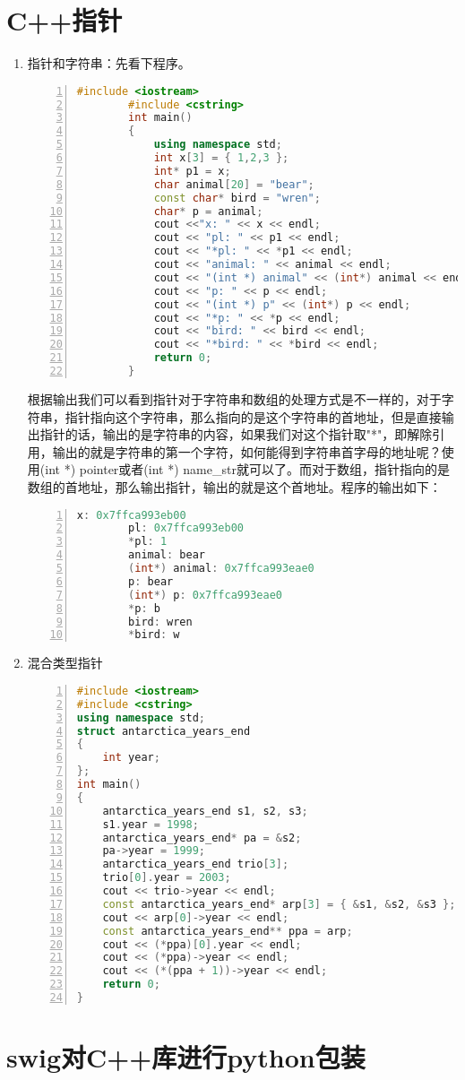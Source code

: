\section{C++指针} %
\label{sec:c_指针}
\begin{enumerate}
	\item 指针和字符串：先看下程序。
	\begin{lstlisting}[language=C++, numbers=left, 
         numberstyle=\tiny,keywordstyle=\color{blue!70},
         commentstyle=\color{red!50!green!50!blue!50},frame=shadowbox,
         rulesepcolor=\color{red!20!green!20!blue!20},basicstyle=\ttfamily]
		#include <iostream>
		#include <cstring>
		int main()
		{
			using namespace std;
			int x[3] = { 1,2,3 };
			int* p1 = x;
			char animal[20] = "bear";
			const char* bird = "wren";
			char* p = animal;
			cout <<"x: " << x << endl;
			cout << "pl: " << p1 << endl;
			cout << "*pl: " << *p1 << endl;
			cout << "animal: " << animal << endl;
			cout << "(int *) animal" << (int*) animal << endl;	
			cout << "p: " << p << endl;
			cout << "(int *) p" << (int*) p << endl;
			cout << "*p: " << *p << endl;
			cout << "bird: " << bird << endl;
			cout << "*bird: " << *bird << endl;
			return 0;
		}
	\end{lstlisting}
	根据输出我们可以看到指针对于字符串和数组的处理方式是不一样的，对于字符串，指针指向这个字符串，那么指向的是这个字符串的首地址，但是直接输出指针的话，输出的是字符串的内容，如果我们对这个指针取"*"，即解除引用，输出的就是字符串的第一个字符，如何能得到字符串首字母的地址呢？使用(int *) pointer或者(int *) name\_str就可以了。而对于数组，指针指向的是数组的首地址，那么输出指针，输出的就是这个首地址。程序的输出如下：
	\begin{lstlisting}[language=C++, numbers=left, 
         numberstyle=\tiny,keywordstyle=\color{blue!70},
         commentstyle=\color{red!50!green!50!blue!50},frame=shadowbox,
         rulesepcolor=\color{red!20!green!20!blue!20},basicstyle=\ttfamily]
		x: 0x7ffca993eb00
		pl: 0x7ffca993eb00
		*pl: 1
		animal: bear
		(int*) animal: 0x7ffca993eae0
		p: bear
		(int*) p: 0x7ffca993eae0
		*p: b
		bird: wren
		*bird: w
	\end{lstlisting}
	\item 混合类型指针
\begin{lstlisting}[language=C++, numbers=left, 
         numberstyle=\tiny,keywordstyle=\color{blue!70},
         commentstyle=\color{red!50!green!50!blue!50},frame=shadowbox,
         rulesepcolor=\color{red!20!green!20!blue!20},basicstyle=\ttfamily]
#include <iostream>
#include <cstring>
using namespace std;
struct antarctica_years_end
{
	int year;
};
int main()
{
	antarctica_years_end s1, s2, s3;
	s1.year = 1998;
	antarctica_years_end* pa = &s2;
	pa->year = 1999;
	antarctica_years_end trio[3];
	trio[0].year = 2003;
	cout << trio->year << endl;
	const antarctica_years_end* arp[3] = { &s1, &s2, &s3 };
	cout << arp[0]->year << endl;
	const antarctica_years_end** ppa = arp;
	cout << (*ppa)[0].year << endl;
	cout << (*ppa)->year << endl;
	cout << (*(ppa + 1))->year << endl;
	return 0;
}
\end{lstlisting}	
\end{enumerate}

\section{swig对C++库进行python包装}